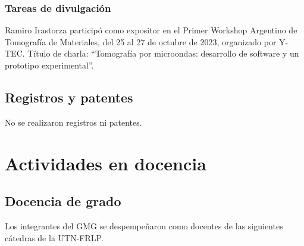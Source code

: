 \documentclass[a4paper,11pt,twoside,final,titlepage,onecolumn,openright]{report}
\begin{document}
% 
% 
% 
%  


\subsection{Tareas de divulgación}

Ramiro Irastorza participó como expositor en el Primer Workshop Argentino de Tomografía de Materiales, del 25 al 27 de octubre de 2023, organizado por Y-TEC. Título de charla: ``Tomografía por microondas: desarrollo de software y un prototipo experimental''.

\section{Registros y patentes}

No se realizaron registros ni patentes.



\chapter{Actividades en docencia}

\section{Docencia de grado}

Los integrantes del GMG se despempeñaron como docentes de las siguientes cátedras de la UTN-FRLP.
\end{document}
